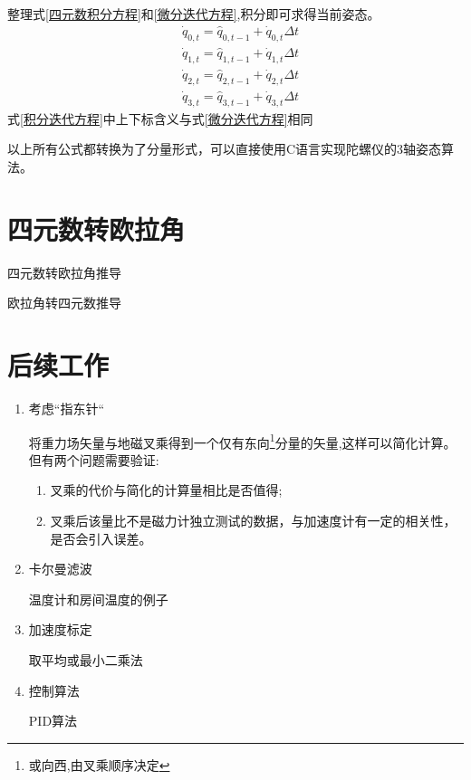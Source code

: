 \documentclass[12pt,a4paper]{article}
\begin{document}
\begin{enumerate}
        整理式\ref{四元数积分方程}和\ref{微分迭代方程},积分即可求得当前姿态。
        \begin{equation} \label{积分迭代方程}
            \begin{aligned} 
                &\dot{q}_{0,t} = \hat{q}_{0,t-1} + \dot{q}_{0,t} \Delta t \\
                &\dot{q}_{1,t} = \hat{q}_{1,t-1} + \dot{q}_{1,t} \Delta t \\
                &\dot{q}_{2,t} = \hat{q}_{2,t-1} + \dot{q}_{2,t} \Delta t \\
                &\dot{q}_{3,t} = \hat{q}_{3,t-1} + \dot{q}_{3,t} \Delta t
            \end{aligned}
        \end{equation} 
        式\ref{积分迭代方程}中上下标含义与式\ref{微分迭代方程}相同
\end{enumerate}

以上所有公式都转换为了分量形式，可以直接使用C语言实现陀螺仪的3轴姿态算法。

\section{四元数转欧拉角}
四元数转欧拉角推导

欧拉角转四元数推导

\section{后续工作}
\begin{enumerate}
    \item 考虑“指东针“

        将重力场矢量与地磁叉乘得到一个仅有东向\footnote{或向西,由叉乘顺序决定}分量的矢量,这样可以简化计算。但有两个问题需要验证:
        \begin{enumerate}
            \item 叉乘的代价与简化的计算量相比是否值得;
            \item 叉乘后该量比不是磁力计独立测试的数据，与加速度计有一定的相关性，是否会引入误差。
        \end{enumerate} 
    \item 卡尔曼滤波

        温度计和房间温度的例子
    \item 加速度标定

        取平均或最小二乘法
    \item 控制算法

        PID算法
\end{enumerate}

\newpage
\renewcommand\refname{参考文献}
\centering %


\end{document}
